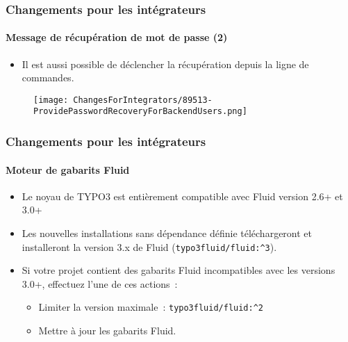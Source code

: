 
\begin{frame}[fragile]
	\frametitle{Changements pour les intégrateurs}
	\framesubtitle{Message de récupération de mot de passe (2)}

	\begin{itemize}
		\item Il est aussi possible de déclencher la récupération depuis la ligne de commandes.
	\end{itemize}

	\begin{figure}
		\texttt{[image: ChangesForIntegrators/89513-ProvidePasswordRecoveryForBackendUsers.png]}
	\end{figure}

\end{frame}


\begin{frame}[fragile]
	\frametitle{Changements pour les intégrateurs}
	\framesubtitle{Moteur de gabarits Fluid}

	\begin{itemize}
		\item Le noyau de TYPO3 est entièrement compatible avec Fluid version 2.6+ et 3.0+
		\item Les nouvelles installations sans dépendance définie téléchargeront et installeront
			la version 3.x de Fluid (\texttt{typo3fluid/fluid:\^{}3}).
		\item Si votre projet contient des gabarits Fluid incompatibles avec les versions 3.0+,
			effectuez l'une de ces actions~:

			\begin{itemize}
				\item Limiter la version maximale~: \texttt{typo3fluid/fluid:\^{}2}
				\item Mettre à jour les gabarits Fluid.
			\end{itemize}

	\end{itemize}

\end{frame}


